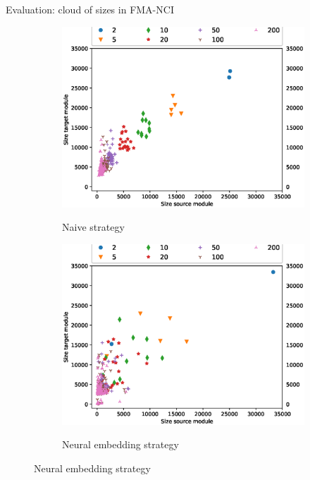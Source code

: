 \documentclass[t]{beamer}
\begin{document}
\begin{frame}{Evaluation: cloud of sizes in FMA-NCI }
	\begin{figure}[t]
    \centering
    \begin{subfigure}[b]{0.495\textwidth}
        \centering
        \includegraphics[width=\textwidth]{figures/cloud_fma2nci_naive.eps}\\[-1ex]
        \caption{Naive strategy}
        \label{fig:f2n-naive}
    \end{subfigure}
    \begin{subfigure}[b]{0.495\textwidth}
        \centering
        \includegraphics[width=\textwidth]{figures/cloud_fma2nci_advanced.eps}\\[-1ex]
        \caption{Neural embedding strategy}
        \label{fig:f2n-advanced}
    \end{subfigure}

\end{figure}	
  	
\end{frame}
\end{document}
